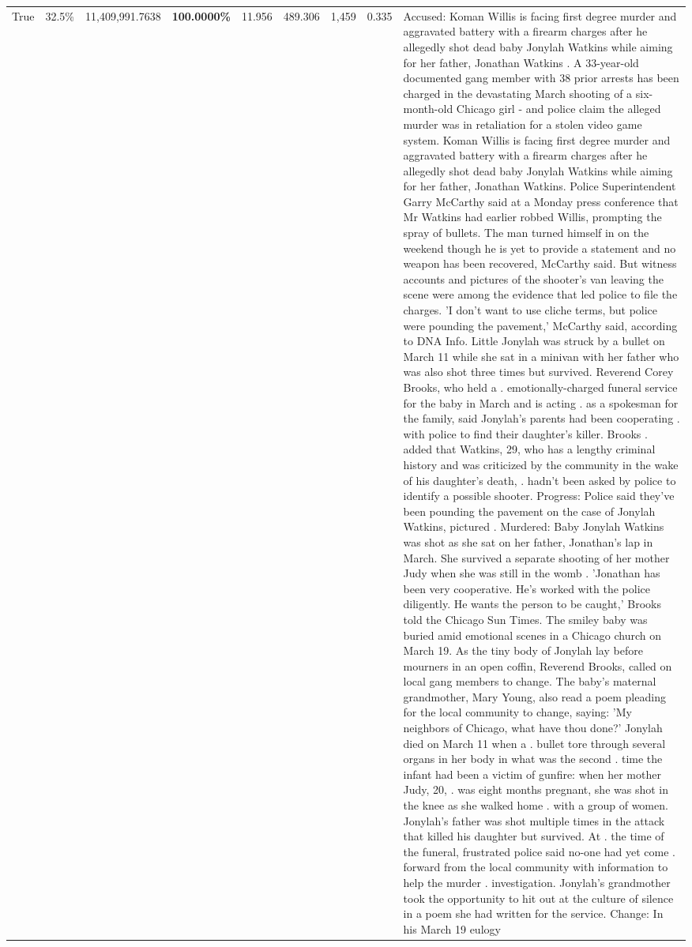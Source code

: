 \begin{table}[H]
\begin{tabular}{lllrlllll}
True & 32.5\% & 11,409,991.7638 & \bfseries \color{red} 100.0000\% & 11.956 & 489.306 & 1,459 & 0.335 & Accused: Koman Willis is facing first degree murder and aggravated battery with a firearm charges after he allegedly shot dead baby Jonylah Watkins while aiming for her father, Jonathan Watkins . A 33-year-old documented gang member with 38 prior arrests has been charged in the devastating March shooting of a six-month-old Chicago girl - and police claim the alleged murder was in retaliation for a stolen video game system. Koman Willis is facing first degree murder and aggravated battery with a firearm charges after he allegedly shot dead baby Jonylah Watkins while aiming for her father, Jonathan Watkins. Police Superintendent Garry McCarthy said at a Monday press conference that Mr Watkins had earlier robbed Willis, prompting the spray of bullets. The man turned himself in on the weekend though he is yet to provide a statement and no weapon has been recovered, McCarthy said. But witness accounts and pictures of the shooter's van leaving the scene were among the evidence that led police to file the charges. 'I don't want to use cliche terms, but police were pounding the pavement,' McCarthy said, according to DNA Info. Little Jonylah was struck by a bullet on March 11 while she sat in a minivan with her father who was also shot three times but survived. Reverend Corey Brooks, who held a . emotionally-charged funeral service for the baby in March and is acting . as a spokesman for the family, said Jonylah's parents had been cooperating . with police to find their daughter's killer. Brooks . added that Watkins, 29, who has a lengthy criminal history and was criticized by the community in the wake of his daughter's death, . hadn't been asked by police to identify a possible shooter. Progress: Police said they've been pounding the pavement on the case of Jonylah Watkins, pictured . Murdered: Baby Jonylah Watkins was shot as she sat on her father, Jonathan's lap in March. She survived a separate shooting of her mother Judy when she was still in the womb . 'Jonathan has been very cooperative. He's worked with the police diligently. He wants the person to be caught,' Brooks told the Chicago Sun Times. The smiley baby was buried amid emotional scenes in a Chicago church on March 19. As the tiny body of Jonylah lay before mourners in an open coffin, Reverend Brooks, called on local gang members to change. The baby's maternal grandmother, Mary Young, also read a poem pleading for the local community to change, saying: 'My neighbors of Chicago, what have thou done?' Jonylah died on March 11 when a . bullet tore through several organs in her body in what was the second . time the infant had been a victim of gunfire: when her mother Judy, 20, . was eight months pregnant, she was shot in the knee as she walked home . with a group of women. Jonylah's father was shot multiple times in the attack that killed his daughter but survived. At . the time of the funeral, frustrated police said no-one had yet come . forward from the local community with information to help the murder . investigation. Jonylah's grandmother took the opportunity to hit out at the culture of silence in a poem she had written for the service. Change: In his March 19 eulogy 
\end{tabular}
\end{table}
